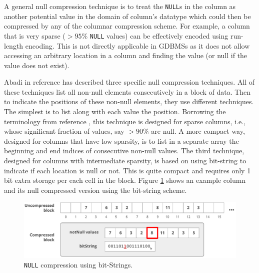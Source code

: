 A general null compression technique is to treat the \texttt{NULL}s in the column as another potential value in the domain of column's datatype which could then be compressed by any of the columnar compression scheme. For example, a column that is very sparse ($>95\%$ \texttt{NULL} values) can be effectively encoded using run-length encoding. This is not directly applicable in GDBMSs as it does not allow accessing an arbitrary location in a column and finding the value (or null if the value does not exist).

Abadi in reference \cite{abadi-sparse-col} has described three specific null compression techniques. All of these techniques list all non-null elements consecutively in a block of data. Then to indicate the positions of these non-null elements, they use different techniques. The simplest is to list along with each value the position. Borrowing the terminology from reference \cite{abadi-sparse-col}, this technique is designed for sparse columns, i.e., whose significant fraction of values, say $> 90\%$ are null. A more compact way, designed for columns that have low sparsity, is to list in a separate array the beginning and end indices of consecutive non-null values. The third technique, designed for columns with intermediate sparsity, is based on using bit-string to indicate if each location is null or not.  This is quite compact and requires only 1 bit extra storage per each cell in the block. Figure \ref{fig:null1} shows an example column and its null compressed version using the bit-string scheme. 

\begin{figure}
	\hfill\includegraphics[scale=0.70]{img/null1}\hspace*{\fill}
	\captionsetup{justification=centering}
	\caption{\texttt{NULL} compression using bit-Strings.}
	\label{fig:null1}
\end{figure}


